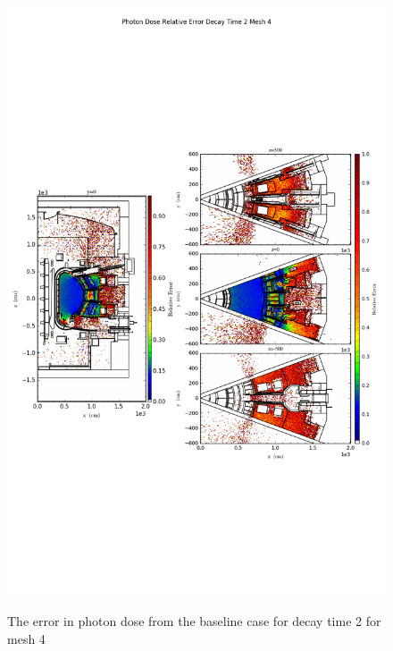 \begin{figure}[ht!]
\centering
\includegraphics[trim={0cm 9cm 0cm 10cm},clip,scale=0.75]{../plots/final_model_nob4c/Photon_Dose_Relative_Error_Decay_Time_2_Mesh_4.png}
\label{fig:photons_dc2_no4bc_m4_error}
\caption{The error in photon dose from the baseline case for decay time 2 for mesh 4}
\end{figure}
